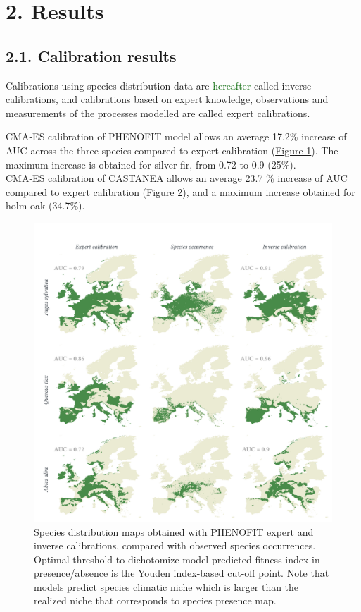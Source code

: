 \documentclass[11pt,]{article}
\begin{document}
\hypertarget{results}{%
\section{2. Results}\label{results}}

\hypertarget{calibration-results}{%
\subsection{2.1. Calibration results}\label{calibration-results}}

Calibrations using species distribution data are
\textcolor{darkgreen}{hereafter} called inverse calibrations, and
calibrations based on expert knowledge, observations and measurements of
the processes modelled are called expert calibrations.

CMA-ES calibration of PHENOFIT model allows an average 17.2\% increase
of AUC across the three species compared to expert calibration
(\hyperref[fig:phenofitmaps]{Figure 1}). The maximum increase is
obtained for silver fir, from 0.72 to 0.9 (25\%).\\
CMA-ES calibration of CASTANEA allows an average 23.7 \% increase of AUC
compared to expert calibration (\hyperref[fig:castaneamaps]{Figure 2}),
and a maximum increase obtained for holm oak (34.7\%).

\begin{figure}[H]

{\centering \includegraphics{figs/phenofitmaps} 

}

\caption{Species distribution maps obtained with PHENOFIT expert and inverse calibrations, compared with observed species occurrences. Optimal threshold to dichotomize model predicted fitness index in presence/absence is the Youden index-based cut-off point. Note that models predict species climatic niche which is larger than the realized niche that corresponds to species presence map.}\label{fig:phenofitmaps}
\end{figure}
\end{document}
